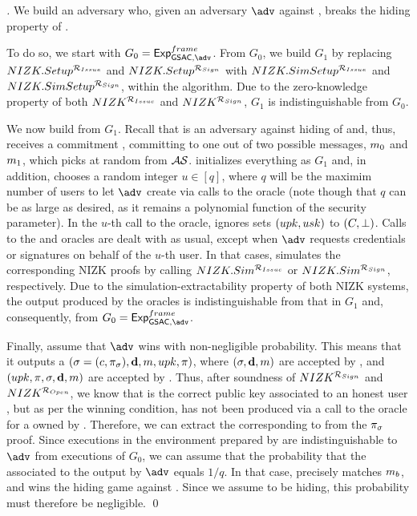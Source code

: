\begin{proof}[]
  We build an adversary \advB who, given an adversary $\adv$ against
  \ExpGSACNonframe, breaks the hiding property of \C.

  To do so, we start with $G_0=\ExpGSACNonframe$. From $G_0$, we build $G_1$
  by replacing $NIZK.Setup^{\mathcal{R}_{Issue}}$ and  $NIZK.Setup^{\mathcal{R}_{Sign}}$
  with $NIZK.SimSetup^{\mathcal{R}_{Issue}}$ and $NIZK.SimSetup^{\mathcal{R}_{Sign}}$,
  within the \Setup algorithm. Due to the zero-knowledge property of both
  $NIZK^{\mathcal{R}_{Issue}}$ and $NIZK^{\mathcal{R}_{Sign}}$, $G_1$ is
  indistinguishable from $G_0$.

  We now build \advB from $G_1$. Recall that \advB is an adversary against
  hiding of \C and, thus, receives a commitment \Ccom, committing to one out
  of two possible messages, $m_0$ and $m_1$, which \advB picks at random
  from $\mathcal{AS}$. \advB initializes everything as $G_1$ and, in addition,
  chooses a random integer $u \in [q]$, where $q$ will be the maximim number of
  users to let $\adv$ create via calls to the \HUGEN oracle (note though that
  $q$ can be as large as desired, as it remains a polynomial function of the
  security parameter). In the $u$-th call to the \HUGEN oracle, \advB ignores
  sets $(upk,usk)$ to $(C,\bot)$. Calls to the \OBTAIN and \SIGN oracles
  are dealt with as usual, except when $\adv$ requests credentials or signatures
  on behalf of the $u$-th user. In that cases, \advB simulates the corresponding
  NIZK proofs by calling $NIZK.Sim^{\mathcal{R}_{Issue}}$ or
  $NIZK.Sim^{\mathcal{R}_{Sign}}$, respectively. Due to the
  simulation-extractability property of both NIZK systems, the output produced
  by the oracles is indistinguishable from that in $G_1$ and, consequently, from
  $G_0=\ExpGSACNonframe$.

  Finally, assume that $\adv$ wins \ExpGSACNonframe with non-negligible
  probability. This means that it outputs a $(\sigma = (c,\pi_\sigma),\mathbf{d},
  m,upk,\pi)$, where $(\sigma,\mathbf{d},m)$ are accepted by \Verify, and
  $(upk,\pi,\sigma,\mathbf{d},m)$ are accepted by \Judge. Thus, after soundness
  of $NIZK^{\mathcal{R}_{Sign}}$ and $NIZK^{\mathcal{R}_{Open}}$, we know that
  \upk is the correct public key associated to an honest user \uid, but as per
  the winning condition, \sig has not been produced via a call to the \SIGN
  oracle for a \cid owned by \uid. Therefore, we can extract the \usk
  corresponding to \upk from the $\pi_{\sigma}$ proof. Since executions in the
  environment prepared by \advB are indistinguishable to $\adv$ from executions
  of $G_0$, we can assume that the probability that the \uid associated to the
  \sig output by $\adv$ equals $1/q$. In that case, \usk precisely matches
  $m_b$, and \advB wins the hiding game against \C. Since we assume \C
  to be hiding, this probability must therefore be negligible.   
  \qed
\end{proof}

